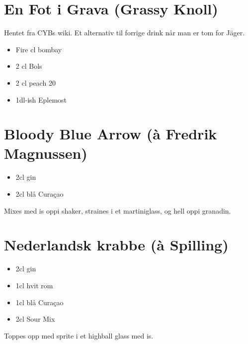 \section*{En Fot i Grava (Grassy Knoll)}

Hentet fra CYBs wiki. Et alternativ til forrige drink når man er tom for Jäger.

\begin{itemize}
	\item Fire cl bombay
	\item 2 cl Bols
	\item 2 cl peach 20%
	\item 1dl-ish Eplemost
\end{itemize}

\section*{Bloody Blue Arrow (à Fredrik Magnussen)}

\begin{itemize}
	\item 2cl gin
	\item 2cl blå Curaçao
\end{itemize}

Mixes med is oppi shaker, straines i et martiniglass, og hell oppi granadin.

\section*{Nederlandsk krabbe (à Spilling)}

\begin{itemize}
	\item 2cl gin
	\item 1cl hvit rom
	\item 1cl blå Curaçao
	\item 2cl Sour Mix
\end{itemize}

Toppes opp med sprite i et highball glass med is.